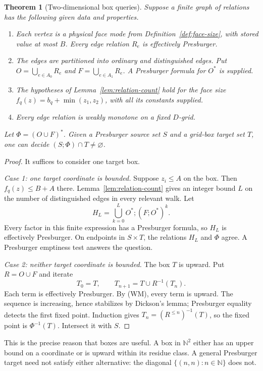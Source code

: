 \documentclass[11pt,a4paper]{article}
\newtheorem{theorem}{Theorem}[section]
\theoremstyle{definition}
\theoremstyle{remark}
\newcommand{\N}{\mathbb N}
\begin{document}
\begin{theorem}[Two-dimensional box queries]
\label{thm:face-query}
Suppose a finite graph of relations has the following given data and
properties.
\begin{enumerate}[label=\textnormal{(F\arabic*)},leftmargin=*]
\item Each vertex is a physical face mode from
Definition~\ref{def:face-size}, with stored value at most \(B\).
Every edge relation \(R_e\) is effectively Presburger.
\item The edges are partitioned into ordinary and distinguished
edges. Put \(O=\bigcup_{e\in A_0}R_e\) and
\(F=\bigcup_{e\in A_1}R_e\). A Presburger formula for \(O^*\)
is supplied.
\item The hypotheses of Lemma~\ref{lem:relation-count} hold for the
face size \(f_q(z)=b_q+\min(z_1,z_2)\), with all its constants supplied.
\item Every edge relation is weakly monotone on a fixed \(D\)-grid.
\end{enumerate}
Let \(\Phi=(O\cup F)^*\). Given a Presburger source set \(S\) and a
grid-box target set \(T\), one can decide
\((S;\Phi)\cap T\ne\varnothing\).
\end{theorem}
\begin{proof}
It suffices to consider one target box.

\emph{Case 1: one target coordinate is bounded.}
Suppose \(z_i\le A\) on the box. Then \(f_q(z)\le B+A\) there.
Lemma~\ref{lem:relation-count} gives an integer bound \(L\) on the
number of distinguished edges in every relevant walk. Let
\[
 H_L=\bigcup_{k=0}^{L} O^*;(F;O^*)^k.
 \tag{FP}
\]
Every factor in this finite expression has a Presburger formula, so
\(H_L\) is effectively Presburger. On endpoints in \(S\times T\),
the relations \(H_L\) and \(\Phi\) agree. A Presburger emptiness test
answers the question.

\emph{Case 2: neither target coordinate is bounded.}
The box \(T\) is upward. Put \(R=O\cup F\) and iterate
\[
 T_0=T,\qquad T_{n+1}=T\cup R^{-1}(T_n).
 \tag{UP}
\]
Each term is effectively Presburger. By (WM), every term is upward.
The sequence is increasing, hence stabilizes by Dickson's lemma;
Presburger equality detects the first fixed point.
Induction gives \(T_n=(R^{\le n})^{-1}(T)\), so the fixed point is
\(\Phi^{-1}(T)\). Intersect it with \(S\).
\end{proof}

This is the precise reason that boxes are useful. A box in \(\N^2\)
either has an upper bound on a coordinate or is upward within its
residue class. A general Presburger target need not satisfy either
alternative: the diagonal \(\{(n,n):n\in\N\}\) does not.
\end{document}
